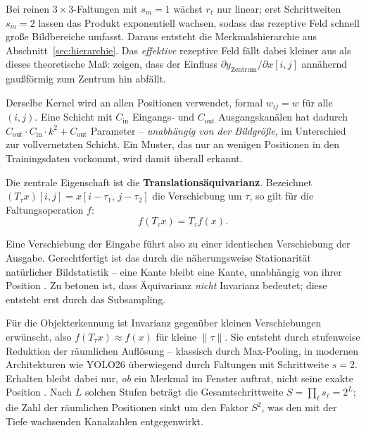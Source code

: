 Bei reinen $3\times3$-Faltungen mit $s_m = 1$ wächst $r_\ell$ nur linear; erst
Schrittweiten $s_m = 2$ lassen das Produkt exponentiell wachsen, sodass das
rezeptive Feld schnell große Bildbereiche umfasst. Daraus entsteht die
Merkmalshierarchie aus Abschnitt~\ref{sec:hierarchie}. Das \emph{effektive}
rezeptive Feld fällt dabei kleiner aus als dieses theoretische Maß:
\textcite{luo2016} zeigen, dass der Einfluss
$\partial y_{\text{Zentrum}} / \partial x[i,j]$ annähernd gaußförmig zum Zentrum
hin abfällt.

 Derselbe Kernel wird an allen
Positionen verwendet, formal $w_{ij} = w$ für alle $(i,j)$. Eine Schicht mit
$C_{\text{in}}$ Eingangs- und $C_{\text{out}}$ Ausgangskanälen hat dadurch
$C_{\text{out}} \cdot C_{\text{in}} \cdot k^2 + C_{\text{out}}$ Parameter --
\emph{unabhängig von der Bildgröße}, im Unterschied zur vollvernetzten Schicht.
Ein Muster, das nur an wenigen Positionen in den Trainingsdaten vorkommt, wird
damit überall erkannt.

Die zentrale Eigenschaft ist die \textbf{Translationsäquivarianz}. Bezeichnet
$(T_\tau x)[i,j] = x[i-\tau_1,\,j-\tau_2]$ die Verschiebung um $\tau$, so gilt
für die Faltungsoperation $f$:
\begin{equation}
f(T_\tau x) = T_\tau f(x).
\label{eq:aequivarianz}
\end{equation}

Eine Verschiebung der Eingabe führt also zu einer identischen Verschiebung der
Ausgabe. Gerechtfertigt ist das durch die näherungsweise Stationarität
natürlicher Bildstatistik -- eine Kante bleibt eine Kante, unabhängig von ihrer
Position \parencite{lecun1998,goodfellow2016}. Zu betonen ist, dass Äquivarianz
\emph{nicht} Invarianz bedeutet; diese entsteht erst durch das Subsampling.

 Für die Objekterkennung ist Invarianz gegenüber
kleinen Verschiebungen erwünscht, also $f(T_\tau x) \approx f(x)$ für kleine
$\|\tau\|$. Sie entsteht durch stufenweise Reduktion der räumlichen Auflösung --
klassisch durch Max-Pooling, in modernen Architekturen wie YOLO26 überwiegend
durch Faltungen mit Schrittweite $s = 2$. Erhalten bleibt dabei nur, \emph{ob}
ein Merkmal im Fenster auftrat, nicht seine exakte Position
\parencite{lecun1998,goodfellow2016}. Nach $L$ solchen Stufen beträgt die
Gesamtschrittweite $S = \prod_\ell s_\ell = 2^L$; die Zahl der räumlichen
Positionen sinkt um den Faktor $S^2$, was den mit der Tiefe wachsenden
Kanalzahlen entgegenwirkt.

